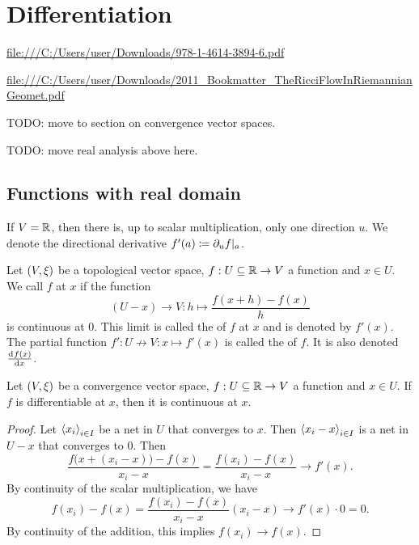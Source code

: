 \chapter{Differentiation}
\url{file:///C:/Users/user/Downloads/978-1-4614-3894-6.pdf}

\url{file:///C:/Users/user/Downloads/2011_Bookmatter_TheRicciFlowInRiemannianGeomet.pdf}

TODO: move to section on convergence vector spaces.

TODO: move real analysis above here.
\section{Functions with real domain}
If $V = \mathbb{R}$, then there is, up to scalar multiplication, only one direction $u$. We denote the directional derivative $f'(a) \coloneqq \partial_u f|_a$.

\begin{definition}
Let $\sSet{V,\xi}$ be a topological vector space, $f: U\subseteq \mathbb{R} \to V$ a function and $x\in U$. We call $f$  at $x$ if the function
\[ (U - x)\to V: h \mapsto \frac{f(x+h) - f(x)}{h} \]
is continuous at $0$. This limit is called the  of $f$ at $x$ and is denoted by $f'(x)$. The partial function $f': U\not\to V: x\mapsto f'(x)$ is called the  of $f$. It is also denoted $\od{f(x)}{x}$.
\end{definition}

\begin{lemma} \label{differentiabilityImpliesContinuity}
Let $\sSet{V,\xi}$ be a convergence vector space, $f: U\subseteq \mathbb{R} \to V$ a function and $x\in U$. If $f$ is differentiable at $x$, then it is continuous at $x$.
\end{lemma}
\begin{proof}
Let $\left\langle x_i \right\rangle_{i\in I}$ be a net in $U$ that converges to $x$. Then $\left\langle x_i - x \right\rangle_{i\in I}$ is a net in $U-x$ that converges to $0$. Then
\[ \frac{f\big(x + (x_i - x)\big) - f(x)}{x_i - x} = \frac{f(x_i) - f(x)}{x_i - x} \to f'(x). \]
By continuity of the scalar multiplication, we have
\[ f(x_i) - f(x) = \frac{f(x_i) - f(x)}{x_i - x}(x_i - x) \to f'(x)\cdot 0 = 0. \]
By continuity of the addition, this implies $f(x_i) \to f(x)$.
\end{proof}

